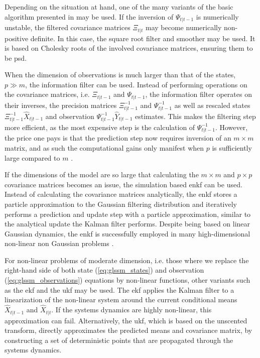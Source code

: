 Depending on the situation at hand, one of the many variants of the basic algorithm presented in  may be used. If the inversion of $\Psi_{t|t-1}$ is numerically unstable, the filtered covariance matrices $\Xi_{t|t}$ may become numerically non-positive definite. In this case, the square root filter and smoother \citep{Morf1975Squareroot} may be used. It is based on Cholesky roots of the involved covariance matrices, ensuring them to be \gls{psd}.

When the dimension of observations is much larger than that of the states, $p \gg m$, the information filter \citep{Fraser1969Optimum} can be used. Instead of performing operations on the covariance matrices, i.e. $\Xi_{t|t-1}$ and $\Psi_{t|t-1}$, the information filter operates on their inverses, the precision matrices $\Xi_{t|t - 1}^{-1}$ and $\Psi_{t|t-1}^{-1}$ as well as rescaled states $\Xi_{t | t - 1}^{-1}
\hat X_{t | t - 1}$ and observation $\Psi_{t | t-1}^{-1}\hat Y_{t|t -1}$ estimates. This makes the filtering step more efficient, as the most expensive step is the calculation of $\Psi_{t | t- 1}^{-1}$. However, the price one pays is that the prediction step now requires inversion of an $m\times m$ matrix, and as such the computational gains only manifest when $p$ is sufficiently large compared to $m$ \citep{Assimakis2012Information}.

If the dimensions of the model are so large that calculating the $m\times m$ and $p\times p$ covariance matrices becomes an issue, the simulation based \acrfull{enkf} \citep{Evensen1994Sequential} can be used. Instead of calculating the covariance matrices analytically, the \gls{enkf} stores a particle approximation to the Gaussian filtering distribution and iteratively performs a prediction and update step with a particle approximation, similar to the analytical update the Kalman filter performs. Despite being based on linear Gaussian dynamics, the \gls{enkf} is successfully employed in many high-dimensional non-linear non Gaussian problems \citep{Katzfuss2016Understanding}. 

For non-linear problems of moderate dimension, i.e. those where we replace the right-hand side of both state (\eqref{eq:glssm_states}) and observation (\eqref{eq:glssm_observations}) equations by non-linear functions, other variants such as the \acrfull{ekf} \citep{Jazwinski1970Stochastic} and the \acrfull{ukf} \citep{Julier1997New} may be used. The \gls{ekf} applies the Kalman filter to a linearization of the non-linear system around the current conditional means $\hat X_{t| t-1}$ and $\hat X_{t|t}$. If the systems dynamics are highly non-linear, this approximation can fail. Alternatively, the \gls{ukf}, which is based on the unscented transform, directly approximates the predicted means and covariance matrix, by constructing a set of deterministic points that are propagated through the systems dynamics.

